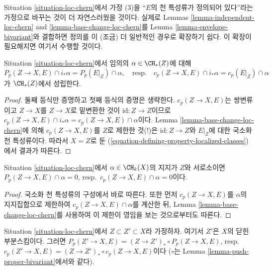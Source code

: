 \begin{remark}
\label{remark-loc-chern}
Situation \ref{situation-loc-chern}에서 가정 (3)을 ``$E$의 천 특성류가
정의되어 있다''라는 가정으로 바꾸는 것이 더 자연스러웠을 것이다.
실제로 Lemmas \ref{lemma-independent-loc-chern} and
\ref{lemma-base-change-loc-chern}를 Lemma
\ref{lemma-envelope-bivariant}와 결합하면 정의를 이 (조금) 더 일반적인
경우로 확장하기 쉽다. 이 확장이 필요해지면 여기서 수행할 것이다.
\end{remark}

\begin{lemma}
\label{lemma-loc-chern-after-pushforward}
Situation \ref{situation-loc-chern}에서 임의의
$\alpha \in \CH_*(Z)$에 대해
$$
P_p(Z \to X, E) \cap i_*\alpha = P_p(E|_Z) \cap \alpha,
\quad\text{resp.}\quad
c_p(Z \to X, E) \cap i_*\alpha = c_p(E|_Z) \cap \alpha
$$
가 $\CH_*(Z)$에서 성립한다.
\end{lemma}

\begin{proof}
둘째 등식만 증명하고 첫째 등식의 증명은 생략한다.
$c_p(Z \to X, E)$는 쌍변류이고 $Z \to X$를 $Z \to X$로 밑변환한 것이
$\text{id} : Z \to Z$이므로
$c_p(Z \to X, E) \cap i_*\alpha = c_p(Z \to X, E) \cap \alpha$이다.
Lemma \ref{lemma-base-change-loc-chern}에 의해 $c_p(Z \to X, E)$를
$Z$로 제한한 것(!)은 $\text{id} : Z \to Z$와 $E|_Z$에 대한 국소화
천 특성류이다. 따라서 $X = Z$로 둔
(\ref{equation-defining-property-localized-classes})에서 결과가 따른다.
\end{proof}

\begin{lemma}
\label{lemma-loc-chern-disjoint}
Situation \ref{situation-loc-chern}에서
$\alpha \in \CH_k(X)$의 지지가 $Z$와 서로소이면
$P_p(Z \to X, E) \cap \alpha = 0$,
resp.\ $c_p(Z \to X, E) \cap \alpha = 0$이다.
\end{lemma}

\begin{proof}
국소화 천 특성류의 구성에서 바로 따른다. 또한 먼저
$c_p(Z \to X, E)$를 $\alpha$의 지지집합으로 제한하여
$c_p(Z \to X, E) \cap \alpha$를 계산한 뒤, Lemma
\ref{lemma-base-change-loc-chern}를 사용하여 이 제한이 영임을 보는
것으로부터도 따른다.
\end{proof}

\begin{lemma}
\label{lemma-loc-chern-shrink-Z}
Situation \ref{situation-loc-chern}에서 $Z \subset Z' \subset X$라
가정하자. 여기서 $Z'$은 $X$의 닫힌 부분스킴이다. 그러면
$P_p(Z' \to X, E) = (Z \to Z')_* \circ P_p(Z \to X, E)$,
resp.\ $c_p(Z' \to X, E) = (Z \to Z')_* \circ c_p(Z \to X, E)$이다
($\circ$는 Lemma \ref{lemma-push-proper-bivariant}에서와 같다).
\end{lemma}

